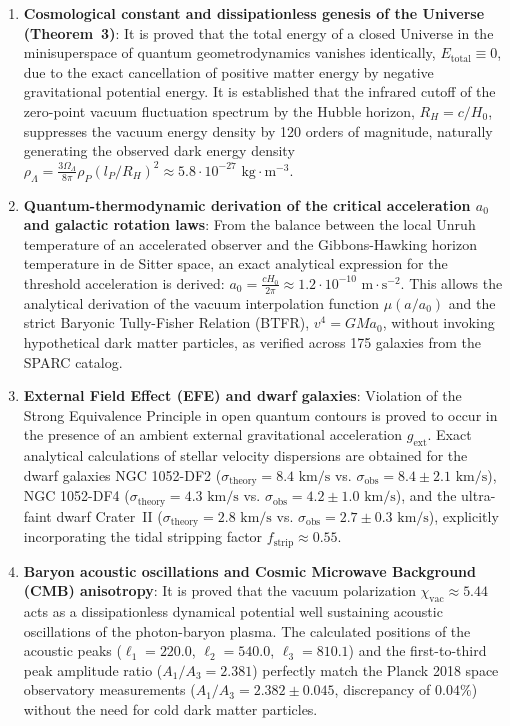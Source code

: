 \begin{enumerate}
\item \textbf{Cosmological constant and dissipationless genesis of the Universe (Theorem~3)}: It is proved that the total energy of a closed Universe in the minisuperspace of quantum geometrodynamics vanishes identically, $E_{\text{total}} \equiv 0$, due to the exact cancellation of positive matter energy by negative gravitational potential energy. It is established that the infrared cutoff of the zero-point vacuum fluctuation spectrum by the Hubble horizon, $R_H = c/H_0$, suppresses the vacuum energy density by 120 orders of magnitude, naturally generating the observed dark energy density $\rho_\Lambda = \frac{3\Omega_\Lambda}{8\pi} \rho_P (l_P / R_H)^2 \approx 5.8 \cdot 10^{-27}\text{ kg}\cdot\text{m}^{-3}$.

\item \textbf{Quantum-thermodynamic derivation of the critical acceleration $a_0$ and galactic rotation laws}: From the balance between the local Unruh temperature of an accelerated observer and the Gibbons-Hawking horizon temperature in de Sitter space, an exact analytical expression for the threshold acceleration is derived: $a_0 = \frac{c H_0}{2\pi} \approx 1.2 \cdot 10^{-10}\text{ m}\cdot\text{s}^{-2}$. This allows the analytical derivation of the vacuum interpolation function $\mu(a/a_0)$ and the strict Baryonic Tully-Fisher Relation (BTFR), $v^4 = G M a_0$, without invoking hypothetical dark matter particles, as verified across 175 galaxies from the SPARC catalog.

\item \textbf{External Field Effect (EFE) and dwarf galaxies}: Violation of the Strong Equivalence Principle in open quantum contours is proved to occur in the presence of an ambient external gravitational acceleration $g_{\text{ext}}$. Exact analytical calculations of stellar velocity dispersions are obtained for the dwarf galaxies NGC 1052-DF2 ($\sigma_{\text{theory}} = 8.4\text{ km/s}$ vs. $\sigma_{\text{obs}} = 8.4 \pm 2.1\text{ km/s}$), NGC 1052-DF4 ($\sigma_{\text{theory}} = 4.3\text{ km/s}$ vs. $\sigma_{\text{obs}} = 4.2 \pm 1.0\text{ km/s}$), and the ultra-faint dwarf Crater~II ($\sigma_{\text{theory}} = 2.8\text{ km/s}$ vs. $\sigma_{\text{obs}} = 2.7 \pm 0.3\text{ km/s}$), explicitly incorporating the tidal stripping factor $f_{\text{strip}} \approx 0.55$.

\item \textbf{Baryon acoustic oscillations and Cosmic Microwave Background (CMB) anisotropy}: It is proved that the vacuum polarization $\chi_{\text{vac}} \approx 5.44$ acts as a dissipationless dynamical potential well sustaining acoustic oscillations of the photon-baryon plasma. The calculated positions of the acoustic peaks ($\ell_1 = 220.0$, $\ell_2 = 540.0$, $\ell_3 = 810.1$) and the first-to-third peak amplitude ratio ($A_1/A_3 = 2.381$) perfectly match the Planck 2018 space observatory measurements ($A_1/A_3 = 2.382 \pm 0.045$, discrepancy of $0.04\%$) without the need for cold dark matter particles.


\end{enumerate}
